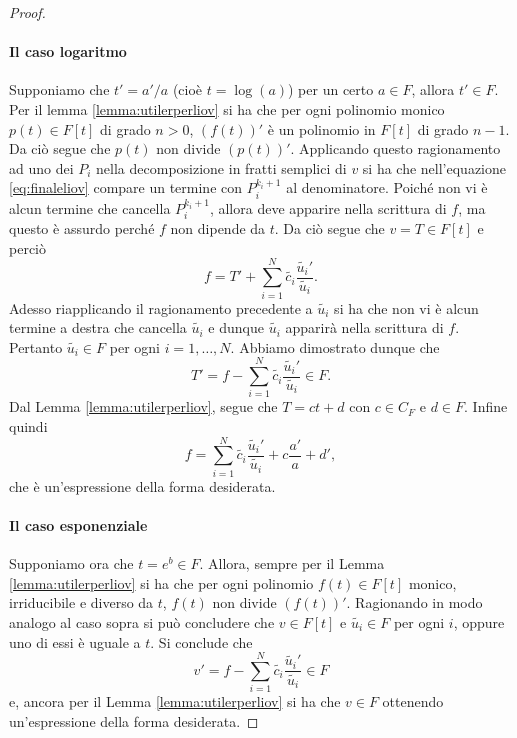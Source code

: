 \documentclass[10pt,oneside]{article}
\theoremstyle{definition}
\theoremstyle{plain}
\theoremstyle{definition}
\theoremstyle{plain}
\theoremstyle{plain}
\begin{document}
\begin{proof}
\paragraph{Il caso logaritmo}
Supponiamo che $t'=a'/a$ (cioè $t=\log(a)$) per un certo $a \in F$, allora $t' \in F$. Per il lemma \ref{lemma:utilerperliov} si ha che per ogni polinomio monico $p(t) \in F[t]$ di grado $n>0$, $(f(t))'$ è un polinomio in $F[t]$ di grado $n-1.$ Da ciò segue che $p(t)$ non divide $(p(t))'$. Applicando questo ragionamento ad uno dei $P_i$ nella decomposizione in fratti semplici di $v$ si ha che nell'equazione \eqref{eq:finaleliov} compare un termine con $P_i^{k_i+1}$ al denominatore. Poiché non vi è alcun termine che cancella $P_i^{k_i+1}$, allora deve apparire nella scrittura di $f$, ma questo è assurdo perché $f$ non dipende da $t$. Da ciò segue che $v=T \in F[t]$ e perciò
\[ f = T' + \sum_{i=1}^N \tilde{c_i}\frac{\tilde{u_i}'}{\tilde{u_i}}. \]
Adesso riapplicando il ragionamento precedente a $\tilde{u_i}$ si ha che non vi è alcun termine a destra che cancella $\tilde{u_i}$ e dunque $\tilde{u_i}$ apparirà nella scrittura di $f$. Pertanto $\tilde{u_i} \in F$ per ogni $i=1,\dots,N$. Abbiamo dimostrato dunque che
\[T'=f - \sum_{i=1}^N \tilde{c_i}\frac{\tilde{u_i}'}{\tilde{u_i}} \in F.\]
Dal Lemma \ref{lemma:utilerperliov}, segue che $T=ct+d$ con $c \in C_F$ e $d \in F$. Infine quindi
\[f= \sum_{i=1}^N \tilde{c_i}\frac{\tilde{u_i}'}{\tilde{u_i}} + c \frac{a'}{a}+d', \]
che è un'espressione della forma desiderata.
\paragraph{Il caso esponenziale}
Supponiamo ora che $t=e^b \in F$. Allora, sempre per il Lemma \ref{lemma:utilerperliov} si ha che per ogni polinomio $f(t) \in F[t]$ monico, irriducibile e diverso da $t$, $f(t)$ non divide $(f(t))'$. Ragionando in modo analogo al caso sopra si può concludere che $v \in F[t]$ e $\tilde{u_i} \in F$ per ogni $i$, oppure uno di essi è uguale a $t$. Si conclude che
\[ v'=f - \sum_{i=1}^N \tilde{c_i}\frac{\tilde{u_i}'}{\tilde{u_i}} \in F \]
e, ancora per il Lemma \ref{lemma:utilerperliov} si ha che $v \in F$ ottenendo un'espressione della forma desiderata.
\end{proof}  
\end{document}
